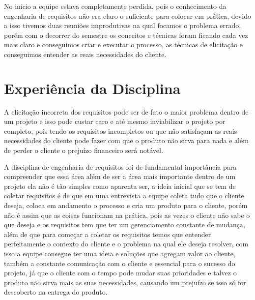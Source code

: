   No início a equipe estava completamente perdida, pois o conhecimento da engenharia de requisitos não era claro o suficiente para colocar em
  prática, devido a isso tivemos duas reuniões improdutivas na qual focamos o problema errado, porém com o decorrer do semestre os conceitos e
  técnicas foram ficando cada vez mais claro e conseguimos criar e executar o processo, as técnicas de elicitação e conseguimos entender as
  reais necessidades do cliente.

\section{Experiência da Disciplina}

  A elicitação incorreta dos requisitos pode ser de fato o maior problema dentro de um projeto e isso pode custar caro e até mesmo inviabilizar
  o projeto por completo, pois tendo os requisitos incompletos ou que não satisfaçam as reais necessidades do cliente pode fazer com que o
  produto não sirva para nada e além de perder o cliente o prejuízo financeiro será notável.

  A disciplina de engenharia de requisitos foi de fundamental import\^{a}ncia para compreender que essa área além de ser a área mais importante
  dentro de um projeto ela não é tão simples como aparenta ser, a ideia inicial que se tem de coletar requisitos é de que em uma entrevista a
  equipe coleta tudo que o cliente deseja, coloca em andamento o processo e cria um produto para o cliente, porém não é assim que as coisas
  funcionam na prática, pois as vezes o cliente não sabe o que deseja e os requisitos tem que ter um gerenciamento constante de mudança, além de
  que para começar a coletar os requisitos temos que entender perfeitamente o contexto do cliente e o problema na qual ele deseja resolver, com
  isso a equipe consegue ter uma ideia e soluções que agregam valor ao cliente, também a constante comunicação com o cliente e essencial para o
  sucesso do projeto, já que o cliente com o tempo pode mudar suas prioridades e talvez o produto não sirva mais as suas necessidades, causando
  um prejuízo se isso só for descoberto na entrega do produto.

